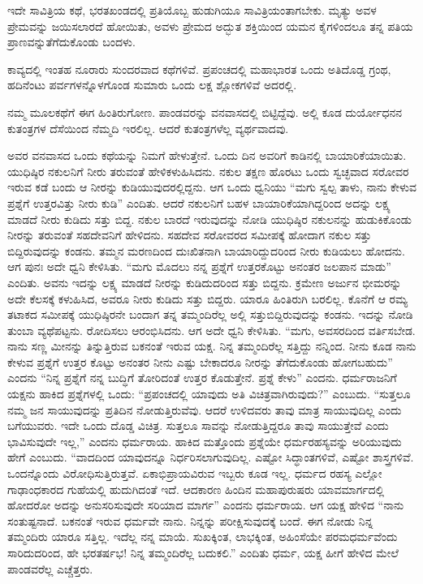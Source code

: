 \vskip 0.1cm

ಇದೇ ಸಾವಿತ್ರಿಯ ಕಥೆ, ಭರತಖಂಡದಲ್ಲಿ ಪ್ರತಿಯೊಬ್ಬ ಹುಡುಗಿಯೂ ಸಾವಿತ್ರಿಯಂತಾಗಬೇಕು. ಮೃತ್ಯು ಅವಳ ಪ್ರೇಮವನ್ನು ಜಯಿಸಲಾರದೆ ಹೋಯಿತು, ಅವಳು ಪ್ರೇಮದ ಅದ್ಭುತ ಶಕ್ತಿಯಿಂದ ಯಮನ ಕೈಗಳಿಂದಲೂ ತನ್ನ ಪತಿಯ ಪ್ರಾಣವನ್ನು\break ತೆಗೆದುಕೊಂಡು ಬಂದಳು.

\vskip 0.1cm

ಕಾವ್ಯದಲ್ಲಿ ಇಂತಹ ನೂರಾರು ಸುಂದರವಾದ ಕಥೆಗಳಿವೆ. ಪ್ರಪಂಚದಲ್ಲಿ ಮಹಾಭಾರತ ಒಂದು ಅತಿದೊಡ್ಡ ಗ್ರಂಥ, ಹದಿನೆಂಟು ಪರ್ವಗಳನ್ನೊಳಗೊಂಡ ಸುಮಾರು ಒಂದು ಲಕ್ಷ ಶ್ಲೋಕಗಳಿವೆ ಅದರಲ್ಲಿ.

\vskip 0.1cm

ನಮ್ಮ ಮೂಲಕಥೆಗೆ ಈಗ ಹಿಂತಿರುಗೋಣ. ಪಾಂಡವರನ್ನು ವನವಾಸದಲ್ಲಿ ಬಿಟ್ಟಿದ್ದೆವು. ಅಲ್ಲಿ ಕೂಡ ದುರ್ಯೋಧನನ ಕುತಂತ್ರಗಳ ದೆಸೆಯಿಂದ ನೆಮ್ಮದಿ ಇರಲಿಲ್ಲ. ಆದರೆ ಕುತಂತ್ರಗಳೆಲ್ಲ ವ್ಯರ್ಥವಾದವು.

\vskip 0.1cm

ಅವರ ವನವಾಸದ ಒಂದು ಕಥೆಯನ್ನು ನಿಮಗೆ ಹೇಳುತ್ತೇನೆ. ಒಂದು ದಿನ ಅವರಿಗೆ ಕಾಡಿನಲ್ಲಿ ಬಾಯಾರಿಕೆಯಾಯಿತು. ಯುಧಿಷ್ಠಿರ ನಕುಲನಿಗೆ ನೀರು ತರುವಂತೆ ಹೇಳಿಕಳುಹಿಸಿದನು. ನಕುಲ ತಕ್ಷಣ ಹೊರಟು ಒಂದು ಸ್ವಚ್ಛವಾದ ಸರೋವರ ಇರುವ ಕಡೆ ಬಂದು ಆ ನೀರನ್ನು ಕುಡಿಯುವುದರಲ್ಲಿದ್ದನು. ಆಗ ಒಂದು ಧ್ವನಿಯು “ಮಗು ಸ್ವಲ್ಪ ತಾಳು, ನಾನು ಕೇಳುವ ಪ್ರಶ್ನೆಗೆ ಉತ್ತರವಿತ್ತು ನೀರು ಕುಡಿ” ಎಂದಿತು. ಆದರೆ ನಕುಲನಿಗೆ ಬಹಳ ಬಾಯಾರಿಕೆಯಾಗಿದ್ದರಿಂದ ಅದನ್ನು ಲಕ್ಷ್ಯ ಮಾಡದೆ ನೀರು ಕುಡಿದು ಸತ್ತು ಬಿದ್ದ. ನಕುಲ ಬಾರದೆ ಇರುವುದನ್ನು ನೋಡಿ ಯುಧಿಷ್ಠಿರ ನಕುಲನನ್ನು ಹುಡುಕಿಕೊಂಡು ನೀರನ್ನು ತರುವಂತೆ ಸಹದೇವನಿಗೆ ಹೇಳಿದನು. ಸಹದೇವ ಸರೋವರದ ಸಮೀಪಕ್ಕೆ ಹೋದಾಗ ನಕುಲ ಸತ್ತು ಬಿದ್ದಿರುವುದನ್ನು ಕಂಡನು. ತಮ್ಮನ ಮರಣದಿಂದ ದುಃಖಿತನಾಗಿ ಬಾಯಾರಿದ್ದುದರಿಂದ ನೀರು ಕುಡಿಯಲು ಹೋದನು. ಆಗ ಪುನಃ ಅದೇ ಧ್ವನಿ ಕೇಳಿಸಿತು. “ಮಗು ಮೊದಲು ನನ್ನ ಪ್ರಶ್ನೆಗೆ ಉತ್ತರಕೊಟ್ಟು ಅನಂತರ ಜಲಪಾನ ಮಾಡು” ಎಂದಿತು. ಅವನು ಇದನ್ನು ಲಕ್ಷ್ಯ ಮಾಡದೆ ನೀರನ್ನು ಕುಡಿದುದರಿಂದ ಸತ್ತು ಬಿದ್ದನು. ಕ್ರಮೇಣ ಅರ್ಜುನ ಭೀಮರನ್ನು ಅದೇ ಕೆಲಸಕ್ಕೆ ಕಳುಹಿಸಿದ, ಅವರೂ ನೀರು ಕುಡಿದು ಸತ್ತು ಬಿದ್ದರು. ಯಾರೂ ಹಿಂತಿರುಗಿ ಬರಲಿಲ್ಲ. ಕೊನೆಗೆ ಆ ರಮ್ಯ ತಟಾಕದ ಸಮೀಪಕ್ಕೆ ಯುಧಿಷ್ಠಿರನೇ ಬಂದಾಗ ತನ್ನ ತಮ್ಮಂದಿರೆಲ್ಲ ಅಲ್ಲಿ ಸತ್ತುಬಿದ್ದಿರುವುದನ್ನು ಕಂಡನು. ಇದನ್ನು ನೋಡಿ ತುಂಬಾ ವ್ಯಥೆಪಟ್ಟನು. ರೋದಿಸಲು ಆರಂಭಿಸಿದನು. ಆಗ ಅದೇ ಧ್ವನಿ ಕೇಳಿಸಿತು. “ಮಗು, ಅವಸರದಿಂದ ವರ್ತಿಸಬೇಡ. ನಾನು ಸಣ್ಣ ಮೀನನ್ನು ತಿನ್ನುತ್ತಿರುವ ಬಕನಂತೆ ಇರುವ ಯಕ್ಷ. ನಿನ್ನ ತಮ್ಮಂದಿರೆಲ್ಲ ಸತ್ತಿದ್ದು ನನ್ನಿಂದ. ನೀನು ಕೂಡ ನಾನು ಕೇಳುವ ಪ್ರಶ್ನೆಗೆ ಉತ್ತರ ಕೊಟ್ಟು ಅನಂತರ ನೀನು ಎಷ್ಟು ಬೇಕಾದರೂ ನೀರನ್ನು ತೆಗೆದುಕೊಂಡು ಹೋಗಬಹುದು” ಎಂದನು “ನಿನ್ನ ಪ್ರಶ್ನೆಗೆ ನನ್ನ ಬುದ್ಧಿಗೆ ತೋರಿದಂತೆ ಉತ್ತರ ಕೊಡುತ್ತೇನೆ. ಪ್ರಶ್ನೆ ಕೇಳು” ಎಂದನು. ಧರ್ಮರಾಜನಿಗೆ ಯಕ್ಷನು ಹಾಕಿದ ಪ್ರಶ್ನೆಗಳಲ್ಲಿ ಒಂದು: “ಪ್ರಪಂಚದಲ್ಲಿ ಯಾವುದು ಅತಿ ವಿಚಿತ್ರವಾಗಿರುವುದು?” ಎಂಬುದು. “ಸುತ್ತಲೂ ನಮ್ಮ ಜನ ಸಾಯುವುದನ್ನು ಪ್ರತಿದಿನ ನೋಡುತ್ತಿರುವೆವು. ಆದರೆ ಉಳಿದವರು ತಾವು ಮಾತ್ರ ಸಾಯುವುದಿಲ್ಲ ಎಂದು ಬಗೆಯುವರು. ಇದೇ ಒಂದು ದೊಡ್ಡ ವಿಚಿತ್ರ. ಸುತ್ತಲೂ ಸಾವನ್ನು ನೋಡುತ್ತಿದ್ದರೂ ತಾವು ಸಾಯುತ್ತೇವೆ ಎಂದು ಭಾವಿಸುವುದೇ ಇಲ್ಲ,” ಎಂದನು ಧರ್ಮರಾಯ. ಹಾಕಿದ ಮತ್ತೊಂದು ಪ್ರಶ್ನೆಯೇ ಧರ್ಮರಹಸ್ಯವನ್ನು ಅರಿಯುವುದು ಹೇಗೆ ಎಂಬುದು. “ವಾದದಿಂದ ಯಾವುದನ್ನೂ ನಿರ್ಧರಿಸಲಾಗುವುದಿಲ್ಲ. ಎಷ್ಟೋ ಸಿದ್ಧಾಂತಗಳಿವೆ, ಎಷ್ಟೋ ಶಾಸ್ತ್ರಗಳಿವೆ. ಒಂದನ್ನೊಂದು ವಿರೋಧಿಸುತ್ತಿರುತ್ತವೆ. ಏಕಾಭಿಪ್ರಾಯವಿರುವ ಇಬ್ಬರು ಕೂಡ ಇಲ್ಲ. ಧರ್ಮದ ರಹಸ್ಯ ಎಲ್ಲೋ ಗಾಢಾಂಧಕಾರದ ಗುಹೆಯಲ್ಲಿ ಹುದುಗಿದಂತೆ ಇದೆ. ಆದಕಾರಣ ಹಿಂದಿನ ಮಹಾಪುರುಷರು ಯಾವ\break ಮಾರ್ಗದಲ್ಲಿ ಹೋದರೋ ಅದನ್ನು ಅನುಸರಿಸುವುದೇ ಸರಿಯಾದ ಮಾರ್ಗ” ಎಂದನು ಧರ್ಮರಾಯ. ಆಗ ಯಕ್ಷ ಹೇಳಿದ “ನಾನು ಸಂತುಷ್ಟನಾದೆ. ಬಕನಂತೆ ಇರುವ ಧರ್ಮವೇ ನಾನು. ನಿನ್ನನ್ನು ಪರೀಕ್ಷಿಸುವುದಕ್ಕೆ ಬಂದೆ. ಈಗ ನೋಡು ನಿನ್ನ ತಮ್ಮಂದಿರು ಯಾರೂ ಸತ್ತಿಲ್ಲ. ಇದೆಲ್ಲ ನನ್ನ ಮಾಯೆ. ಸುಖಕ್ಕಿಂತ, ಲಾಭಕ್ಕಿಂತ, ಅಹಿಂಸೆಯೇ ಪರಮಧರ್ಮವೆಂದು ಸಾರಿದುದರಿಂದ, ಹೇ ಭರತರ್ಷಭ! ನಿನ್ನ ತಮ್ಮಂದಿರೆಲ್ಲ ಬದುಕಲಿ.” ಎಂದಿತು ಧರ್ಮ, ಯಕ್ಷ ಹೀಗೆ ಹೇಳಿದ ಮೇಲೆ ಪಾಂಡವರೆಲ್ಲ ಎಚ್ಚೆತ್ತರು.

